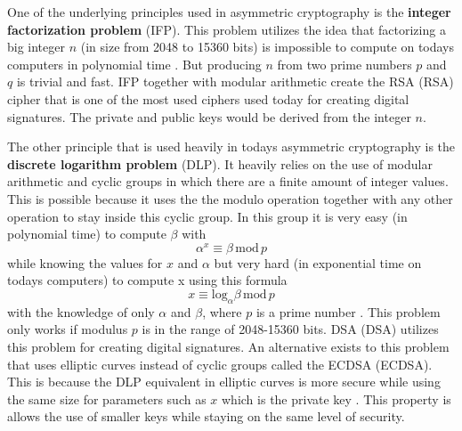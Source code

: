 One of the underlying principles used in asymmetric cryptography is the \textbf{integer factorization problem} (\acs{IFP}). This problem utilizes the idea that factorizing a big integer $n$ (in size from 2048 to 15360 bits) is impossible to compute on todays computers in polynomial time \cite{Paar2010}. But producing $n$ from two prime numbers $p$ and $q$ is trivial and fast. IFP together with modular arithmetic create the RSA (\acl{RSA}) cipher that is one of the most used ciphers used today for creating digital signatures. The private and public keys would be derived from the integer $n$.

The other principle that is used heavily in todays asymmetric cryptography is the \textbf{discrete logarithm problem} (\acs{DLP}). It heavily relies on the use of modular arithmetic and cyclic groups in which there are a finite amount of integer values. This is possible because it uses the the modulo operation together with any other operation to stay inside this cyclic group. In this group it is very easy (in polynomial time) to compute $\beta$ with
\begin{equation}
  \alpha^x\equiv\beta\,\mathrm{mod}\,p
\end{equation}
while knowing the values for $x$ and $\alpha$ but very hard (in exponential time on todays computers) to compute x using this formula
\begin{equation}
  x\equiv\mathrm{log}_\alpha\beta\,\mathrm{mod}\,p
\end{equation}
with the knowledge of only $\alpha$ and $\beta$, where $p$ is a prime number \cite{Paar2010}. This problem only works if modulus $p$ is in the range of 2048-15360 bits. DSA (\acl{DSA}) utilizes this problem for creating digital signatures. An alternative exists to this problem that uses elliptic curves instead of cyclic groups called the \acl{ECDSA} (ECDSA). This is because the DLP equivalent in elliptic curves is more secure while using the same size for parameters such as $x$ which is the private key \cite{Ristic2014}. This property is allows the use of smaller keys while staying on the same level of security.
